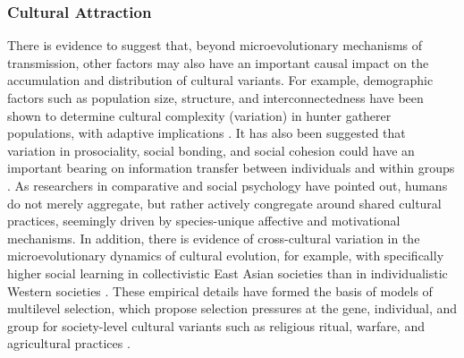 \begin{mccorrection}
  \subsubsection{Cultural Attraction}
  There is evidence to suggest that, beyond microevolutionary mechanisms of transmission, other factors may also have an important causal impact on the accumulation and distribution of cultural variants. For example, demographic factors such as population size, structure, and interconnectedness have been shown to determine cultural complexity (variation) in hunter gatherer populations, with adaptive implications \citep{Henrich2004}.  It has also been suggested that variation in prosociality, social bonding, and social cohesion could have an important bearing on information transfer between individuals and within groups \citep{Heyes2011,Whitehouse2014,Wheatley2016}.  As researchers in comparative and social psychology have pointed out, humans do not merely aggregate, but rather actively congregate around shared cultural practices, seemingly driven by species-unique affective and motivational mechanisms\citep{Dunbar2010,Tomasello2005a}.
  In addition, there is evidence of cross-cultural variation in the microevolutionary dynamics of cultural evolution, for example, with specifically higher social learning in collectivistic East Asian societies than in individualistic Western societies \citep{Mesoudi2015,DiYanni2015}.  These empirical details have formed the basis of models of multilevel selection, which propose
  selection pressures at the gene, individual, and group for society-level cultural variants such as religious ritual, warfare, and agricultural practices  \citep{Turchin2013,Atkinson2011a}.


\end{mccorrection}
